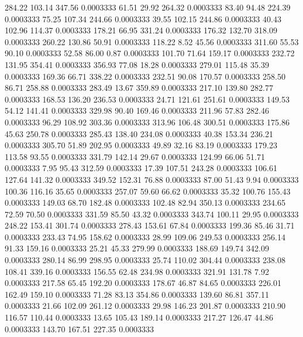  284.22  103.14  347.56   0.0003333
  61.51   29.92  264.32   0.0003333
  83.40   94.48  224.39   0.0003333
  75.25  107.34  244.66   0.0003333
  39.55  102.15  244.86   0.0003333
  40.43  102.96  114.37   0.0003333
 178.21   66.95  331.24   0.0003333
 176.32  132.70  318.09   0.0003333
 260.22  130.86   50.91   0.0003333
 118.22    8.52   45.56   0.0003333
 311.60   55.53   90.10   0.0003333
  52.58   86.00    0.87   0.0003333
 101.70   71.64  159.17   0.0003333
 232.72  131.95  354.41   0.0003333
 356.93   77.08   18.28   0.0003333
 279.01  115.48   35.39   0.0003333
 169.36   66.71  338.22   0.0003333
 232.51   90.08  170.57   0.0003333
 258.50   86.71  258.88   0.0003333
 283.49   13.67  359.89   0.0003333
 217.10  139.80  282.77   0.0003333
 168.53  136.20  236.53   0.0003333
  24.71  121.61  251.61   0.0003333
 149.53   54.12  141.41   0.0003333
 329.98   90.40  169.46   0.0003333
 211.96   57.83  282.46   0.0003333
  96.29  108.92  303.36   0.0003333
 313.96  106.48  300.51   0.0003333
 175.86   45.63  250.78   0.0003333
 285.43  138.40  234.08   0.0003333
  40.38  153.34  236.21   0.0003333
 305.70   51.89  202.95   0.0003333
  49.89   32.16   83.19   0.0003333
 179.23  113.58   93.55   0.0003333
 331.79  142.14   29.67   0.0003333
 124.99   66.06   51.71   0.0003333
   7.95   95.43  312.59   0.0003333
  17.39  107.51  243.28   0.0003333
 106.61  127.64  141.32   0.0003333
 349.52  152.31   76.88   0.0003333
  87.00   51.43    9.94   0.0003333
 100.36  116.16   35.65   0.0003333
 257.07   59.60   66.62   0.0003333
  35.32  100.76  155.43   0.0003333
 149.03   68.70  182.48   0.0003333
 102.48   82.94  350.13   0.0003333
 234.65   72.59   70.50   0.0003333
 331.59   85.50   43.32   0.0003333
 343.74  100.11   29.95   0.0003333
 248.22  153.41  301.74   0.0003333
 278.43  153.61   67.84   0.0003333
 199.36   85.46   31.71   0.0003333
 233.43   74.95  158.62   0.0003333
  28.99  109.06  249.53   0.0003333
 256.14   91.33  159.16   0.0003333
  25.21   45.33  279.99   0.0003333
 188.69  149.74  342.09   0.0003333
 280.14   86.99  298.95   0.0003333
  25.74  110.02  304.44   0.0003333
 238.08  108.41  339.16   0.0003333
 156.55   62.48  234.98   0.0003333
 321.91  131.78    7.92   0.0003333
 217.58   65.45  192.20   0.0003333
 178.67   46.87   84.65   0.0003333
 226.01  162.49  159.10   0.0003333
  71.28   83.13  354.86   0.0003333
 139.60   86.81  357.11   0.0003333
  21.66  102.09  261.12   0.0003333
  29.98  146.23  201.87   0.0003333
 210.90  116.57  110.44   0.0003333
  13.65  105.43  189.14   0.0003333
 217.27  126.47   44.86   0.0003333
 143.70  167.51  227.35   0.0003333
